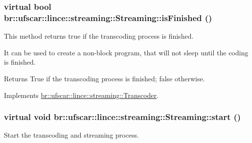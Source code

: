 \hypertarget{classbr_1_1ufscar_1_1lince_1_1streaming_1_1Streaming_ab9859ece4030fe9bf46416a5508f7a0c}{
\subsubsection[{isFinished}]{\setlength{\rightskip}{0pt plus 5cm}virtual bool br::ufscar::lince::streaming::Streaming::isFinished ()}}
\label{classbr_1_1ufscar_1_1lince_1_1streaming_1_1Streaming_ab9859ece4030fe9bf46416a5508f7a0c}


This method returns true if the transcoding process is finished. 

It can be used to create a non-\/block program, that will not sleep until the coding is finished. \begin{DoxyReturn}{Returns}
True if the transcoding process is finished; false otherwise. 
\end{DoxyReturn}


Implements \hyperlink{classbr_1_1ufscar_1_1lince_1_1streaming_1_1Transcoder_a6d2588da9583e98496882efa9b472ec4}{br::ufscar::lince::streaming::Transcoder}.

\hypertarget{classbr_1_1ufscar_1_1lince_1_1streaming_1_1Streaming_a00e16bac644283a701a392039ee43f25}{
\subsubsection[{start}]{\setlength{\rightskip}{0pt plus 5cm}virtual void br::ufscar::lince::streaming::Streaming::start ()}}
\label{classbr_1_1ufscar_1_1lince_1_1streaming_1_1Streaming_a00e16bac644283a701a392039ee43f25}


Start the transcoding and streaming process. 

